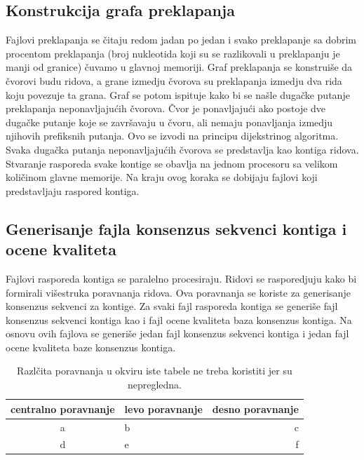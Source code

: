\documentclass[a4paper]{article}
\begin{document}
{\subsection{Konstrukcija grafa preklapanja}
\label{subsec:kgp}
Fajlovi preklapanja se čitaju redom jadan po jedan i svako preklapanje sa dobrim procentom preklapanja (broj nukleotida koji su se razlikovali u preklapanju je manji od granice) čuvamo u glavnoj memoriji. Graf preklapanja se konstruiše da čvorovi budu ridova, a grane izmedju čvorova su preklapanja izmedju dva rida koju povezuje ta grana. Graf se potom ispituje kako bi se našle dugačke putanje preklapanja neponavljajućih čvorova. Čvor je ponavljajući ako postoje dve dugačke putanje koje se završavaju u čvoru, ali nemaju ponavljanja izmedju njihovih prefiksnih putanja. Ovo se izvodi na principu dijekstrinog algoritma. Svaka dugačka putanja neponavljajućih čvorova se predstavlja kao kontiga ridova. Stvaranje rasporeda svake kontige se obavlja na jednom procesoru sa velikom količinom glavne memorije. Na kraju ovog koraka se dobijaju fajlovi koji predstavljaju raspored kontiga.
\subsection{Generisanje fajla konsenzus sekvenci kontiga i ocene kvaliteta}
\label{subsec:gfkskiok}
 Fajlovi rasporeda kontiga se paralelno procesiraju. Ridovi se rasporedjuju kako bi formirali višestruka poravnanja ridova. Ova poravnanja se koriste za generisanje konsenzus sekvenci za kontige. Za svaki fajl rasporeda kontiga se generiše fajl konsenzus sekvenci kontiga kao i fajl ocene kvaliteta baza konsenzus kontiga. Na osnovu ovih fajlova se generiše jedan fajl konsenzus sekvenci kontiga i jedan fajl ocene kvaliteta baze konsenzus kontiga.

\iffalse


\begin{table}[h!]
\begin{center}
\caption{Razlčita poravnanja u okviru iste tabele ne treba koristiti jer su nepregledna.}
\begin{tabular}{|c|l|r|} \hline
centralno poravnanje& levo poravnanje& desno poravnanje\\ \hline
a &b&c\\ \hline
d &e&f\\ \hline
\end{tabular}
\label{tab:tabela1}
\end{center}
\end{table}

}
\end{document}
